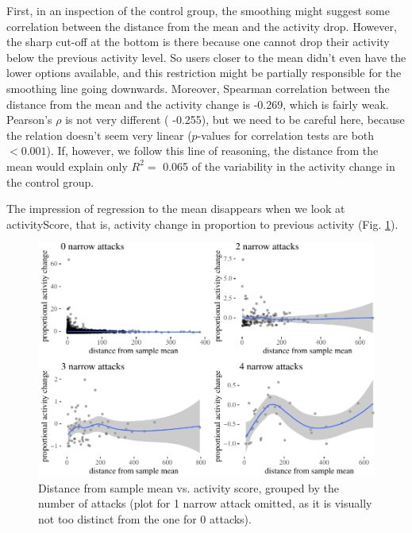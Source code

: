 \documentclass[10pt,]{scrartcl}
\begin{document}
First, in an inspection of the control group, the smoothing might
suggest some correlation between the distance from the mean and the
activity drop. However, the sharp cut-off at the bottom is there because
one cannot drop their activity below the previous activity level. So
users closer to the mean didn't even have the lower options available,
and this restriction might be partially responsible for the smoothing
line going downwards. Moreover, Spearman correlation between the
distance from the mean and the activity change is -0.269, which is
fairly weak. Pearson's \(\rho\) is not very different ( -0.255), but we
need to be careful here, because the relation doesn't seem very linear
(\(p\)-values for correlation tests are both \(<0.001\)). If, however,
we follow this line of reasoning, the distance from the mean would
explain only \(R^2 =\) 0.065 of the variability in the activity change
in the control group.

The impression of regression to the mean disappears when we look at
\textsf{activityScore}, that is, activity change in proportion to
previous activity (Fig. \ref{fig:regression2}).

\begin{figure}

\begin{center}\includegraphics[width=1\linewidth]{redditAnalysisWalkthrough_files/figure-latex/unnamed-chunk-113-1} \end{center}
\caption{Distance from sample mean vs. activity score, grouped by the number of attacks (plot for 1 narrow attack omitted, as it is visually not too distinct from the one for 0 attacks).}
\label{fig:regression2}
\end{figure}
\end{document}

